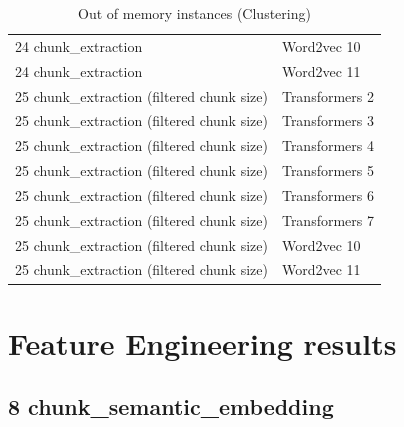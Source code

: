 \begin{table}[H]
\begin{tabular}{ll}
24 chunk\_extraction & Word2vec 10 \\ 
24 chunk\_extraction & Word2vec 11 \\ 
25 chunk\_extraction (filtered chunk size) & Transformers 2 \\ 
25 chunk\_extraction (filtered chunk size) & Transformers 3 \\ 
25 chunk\_extraction (filtered chunk size) & Transformers 4 \\ 
25 chunk\_extraction (filtered chunk size) & Transformers 5 \\ 
25 chunk\_extraction (filtered chunk size) & Transformers 6 \\ 
25 chunk\_extraction (filtered chunk size) & Transformers 7 \\ 
25 chunk\_extraction (filtered chunk size) & Word2vec 10 \\ 
25 chunk\_extraction (filtered chunk size) & Word2vec 11 \\ 
\hline
\end{tabular}
\caption{Out of memory instances (Clustering)}
\label{tab:annexe:out_of_memory_instances_clustering}
\end{table}

\section{Feature Engineering results}

\label{sec:annexe:feature_engineering_results}

\subsection{8 chunk\_semantic\_embedding}

